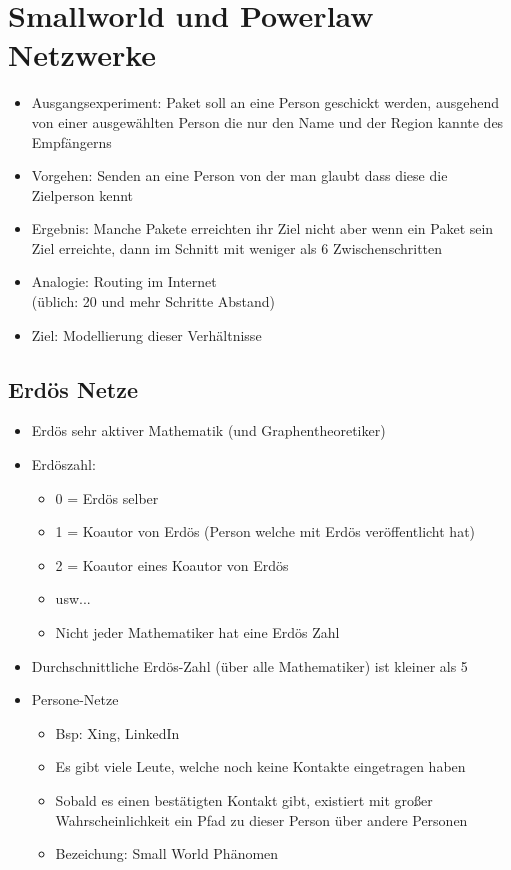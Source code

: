 \documentclass{article} %
\begin{document}
	
	
	\section{Smallworld und Powerlaw Netzwerke}
	\begin{itemize}
		\item Ausgangsexperiment: Paket soll an eine Person geschickt werden, ausgehend von einer ausgewählten Person die nur den Name und der Region kannte des Empfängerns
		\item Vorgehen: Senden an eine Person von der man glaubt dass diese die Zielperson kennt
		\item Ergebnis: Manche Pakete erreichten ihr Ziel nicht aber wenn ein Paket sein Ziel erreichte,
		dann im Schnitt mit weniger als 6 Zwischenschritten
		\item Analogie: Routing im Internet\\
		(üblich: 20 und mehr Schritte Abstand)
		\item Ziel: Modellierung dieser Verhältnisse
	\end{itemize}
	\subsection{Erdös Netze}
	\begin{itemize}
		\item Erdös sehr aktiver Mathematik (und Graphentheoretiker)
		\item Erdöszahl:
		\begin{itemize}
			\item 0 = Erdös selber
			\item 1 = Koautor von Erdös (Person welche mit Erdös veröffentlicht hat)
			\item 2 = Koautor eines Koautor von Erdös 
			\item usw...
			\item Nicht jeder Mathematiker hat eine Erdös Zahl
		\end{itemize}
		\item Durchschnittliche Erdös-Zahl (über alle Mathematiker) ist kleiner als 5
		\item Persone-Netze
		\begin{itemize}
			\item Bsp: Xing, LinkedIn
			\item Es gibt viele Leute, welche noch keine Kontakte eingetragen haben
			\item Sobald es einen bestätigten Kontakt gibt, existiert mit großer Wahrscheinlichkeit ein Pfad zu dieser Person über andere Personen
			\item Bezeichung: Small World Phänomen
		\end{itemize}
	\end{itemize}
\end{document}
